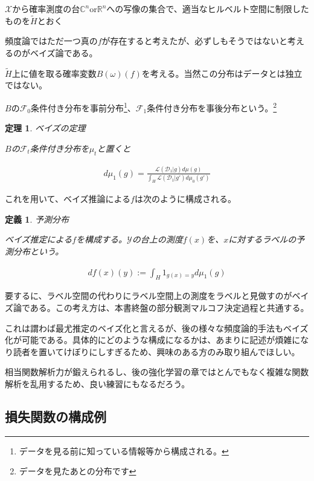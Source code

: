 \documentclass{jsarticle}
\newtheorem{theo}{定理}[section]
\newtheorem{defi}{定義}[section]
\begin{document}
$\mathcal{X}$から確率測度の台$\mathbb{C}^n$or$\mathbb{R}^n$への写像の集合で、適当なヒルベルト空間に制限したものを$\tilde{H}$とおく

頻度論ではただ一つ真の$f$が存在すると考えたが、必ずしもそうではないと考えるのがベイズ論である。

$\tilde{H}$上に値を取る確率変数$B(\omega)(f)$を考える。当然この分布はデータとは独立ではない。

$B$の$\mathcal{F}_0$条件付き分布を事前分布\footnote{データを見る前に知っている情報等から構成される。}、$\mathcal{F}_1$条件付き分布を事後分布という。\footnote{データを見たあとの分布です}

\begin{theo} ベイズの定理

$B$の$\mathcal{F}_t$条件付き分布を$\mu_t$と置くと

\begin{align}
d\mu_1(g) =\frac{\mathcal{L}(\mathcal{D}_1|g)d\mu(g)}{\int_H \mathcal{L}(\mathcal{D}_1|g')d\mu_0(g')}
\end{align}

\end{theo}

これを用いて、ベイズ推論による$f$は次のように構成される。

\begin{defi} 予測分布

ベイズ推定による$f$を構成する。$\mathcal{Y}$の台上の測度$f(x)$を、$x$に対するラベルの予測分布という。

\begin{align}
df(x)(y):=\int_H 1_{g(x)=y}  d\mu_1(g)
\end{align}

\end{defi}

要するに、ラベル空間の代わりにラベル空間上の測度をラベルと見做すのがベイズ論である。この考え方は、本書終盤の部分観測マルコフ決定過程と共通する。

これは謂わば最尤推定のベイズ化と言えるが、後の様々な頻度論的手法もベイズ化が可能である。具体的にどのような構成になるかは、あまりに記述が煩雑になり読者を置いてけぼりにしすぎるため、興味のある方のみ取り組んでほしい。

相当関数解析力が鍛えられるし、後の強化学習の章ではとんでもなく複雑な関数解析を乱用するため、良い練習にもなるだろう。


\subsection{損失関数の構成例}
\end{document}
